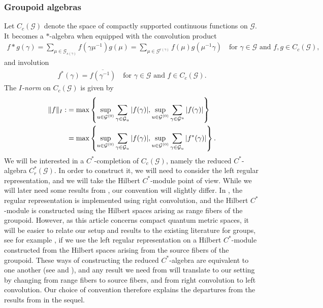 \documentclass[11pt,a4paper,oneside,final,reqno]{amsart}
\theoremstyle{definition}
\newcommand{\G}{\mathcal{G}}
\newcommand{\Go}{\mathcal{G}^{(0)}}
\newcommand{\Cred}{C_{r}^{*}}
\numberwithin{equation}{section}
\begin{document}
	\subsubsection*{Groupoid algebras}
	Let $C_c(\G)$ denote the space of compactly supported continuous functions on $\G$. It becomes a $*$-algebra when equipped with the convolution product
	\begin{align*}
		f * g (\gamma) = \sum_{\mu \in \G_{s(\gamma)}} f(\gamma \mu^{-1}) g(\mu) = \sum_{\mu \in \G^{r(\gamma)}} f(\mu) g(\mu^{-1}\gamma) \quad \text{for $\gamma \in \G$ and } f,g \in C_c(\G) ,
	\end{align*}
	and involution
	\begin{align*}
		f^*(\gamma) = \overline{f(\gamma^{-1})} \quad \text{for $\gamma \in \G$ and $f \in C_c(\G)$.}
	\end{align*} 
	The \emph{$I$-norm} on $C_c(\G)$ is given by 
	\begin{align}\label{eq:def-I-norm}
		\Vert f \Vert_I :&= \max \left\{ \sup_{u \in \Go} \sum_{\gamma \in \G_u} \vert f(\gamma)\vert , \sup_{u \in \Go} \sum_{\gamma \in \G^u } \vert f(\gamma)\vert \right\}\\ 
		&=  \max \left\{ \sup_{u \in \Go} \sum_{\gamma \in \G_u} \vert f(\gamma)\vert , \sup_{u \in \Go}\sum_{\gamma \in \G_u } \vert f^*(\gamma)\vert \right\}. \notag
	\end{align}
	We will be interested in a $C^*$-completion of $C_c(\G)$, namely the reduced $C^*$-algebra $\Cred(\G)$. In order to construct it, we will need to consider the left regular representation, and we will take the Hilbert $C^*$-module point of view. While we will later need some results from \cite{DelarocheExactGroupoidsV3}, our convention will slightly differ. 
	In \cite{DelarocheExactGroupoidsV3}, the regular representation is implemented using right convolution, and the Hilbert $C^*$-module is constructed using the Hilbert spaces arising as range fibers of the groupoid. However, as this article concerns compact quantum metric spaces, it will be easier to relate our setup and results to the existing literature for groups, see for example  \cite{ChristRieffel, OzawaRieffel2004, ChristensenIvanRD}, if we use the left regular representation on a Hilbert $C^*$-module constructed from the Hilbert spaces arising from the source fibers of the groupoid. These ways of constructing the reduced $C^*$-algebra are equivalent to one another (see \cite[Proposition 8]{PatersonFourierAlgebra2004} and \cite[pg. 81-82]{DelarocheExactGroupoidsV3}), and any result we need from \cite{DelarocheExactGroupoidsV3} will translate to our setting by changing from range fibers to source fibers, and from right convolution to left convolution. Our choice of convention therefore explains the departures from the results from \cite{DelarocheExactGroupoidsV3} in the sequel.  
\end{document}
